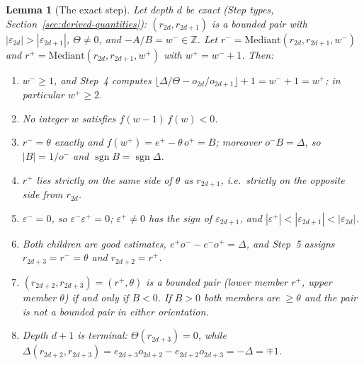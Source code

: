 \documentclass[12pt]{article}
\newtheorem{lemma}[theorem]{Lemma}
\theoremstyle{definition}
\theoremstyle{remark}
\theoremstyle{plain}
\newcommand{\eps}{\varepsilon}
\newcommand{\Kval}{\Theta}
\newcommand{\Dval}{\Delta}
\newcommand{\wplus}{w^{+}}
\newcommand{\wminus}{w^{-}}
\newcommand{\rplus}{r^{+}}
\newcommand{\rminus}{r^{-}}
\newcommand{\eplus}{e^{+}}
\newcommand{\eminus}{e^{-}}
\newcommand{\odenp}{o^{+}}
\newcommand{\odenm}{o^{-}}
\newcommand{\epsplus}{\eps^{+}}
\newcommand{\epsminus}{\eps^{-}}
\begin{document}
\begin{lemma}[The exact step]
\label{lem:exact-step}
Let depth $d$ be exact (\emph{Step types}, Section~\ref{sec:derived-quantities}):
$(r_{2d}, r_{2d+1})$ is a bounded pair with $|\eps_{2d}| > |\eps_{2d+1}|$,
$\Kval \neq 0$, and $-A/B = \wminus \in \mathbb{Z}$.
Let $\rminus = \mathrm{Mediant}(r_{2d}, r_{2d+1}, \wminus)$ and
$\rplus = \mathrm{Mediant}(r_{2d}, r_{2d+1}, \wplus)$ with $\wplus = \wminus + 1$.
Then:
\begin{enumerate}
  \item $\wminus \geq 1$, and Step~4 computes
        $\lfloor \Dval/\Kval - o_{2d}/o_{2d+1} \rfloor + 1 = \wminus + 1 = \wplus$;
        in particular $\wplus \geq 2$.
  \item No integer $w$ satisfies $f(w-1)\,f(w) < 0$.
  \item $\rminus = \theta$ exactly and $f(\wplus) = \eplus - \theta\,\odenp = B$;
        moreover $\odenm B = \Dval$, so $|B| = 1/\odenm$ and
        $\operatorname{sgn} B = \operatorname{sgn} \Dval$.
  \item $\rplus$ lies strictly on the same side of $\theta$ as $r_{2d+1}$, i.e.\
        strictly on the opposite side from $r_{2d}$.
  \item $\epsminus = 0$, so $\epsminus\epsplus = 0$; $\epsplus \neq 0$ has the sign
        of $\eps_{2d+1}$, and $|\epsplus| < |\eps_{2d+1}| < |\eps_{2d}|$.
  \item Both children are good estimates, $\eplus\odenm - \eminus\odenp = \Dval$, and
        Step~5 assigns $r_{2d+3} = \rminus = \theta$ and $r_{2d+2} = \rplus$.
  \item $(r_{2d+2}, r_{2d+3}) = (\rplus, \theta)$ is a bounded pair (lower member $\rplus$,
        upper member $\theta$) if and only if $B < 0$.
        If $B > 0$ both members are $\geq \theta$ and the pair is not a bounded pair in
        either orientation.
  \item Depth $d+1$ is terminal: $\Kval(r_{2d+3}) = 0$, while
        $\Dval(r_{2d+2}, r_{2d+3}) = e_{2d+3}o_{2d+2} - e_{2d+2}o_{2d+3} = -\Dval = \mp 1$.
\end{enumerate}
\end{lemma}
\end{document}
